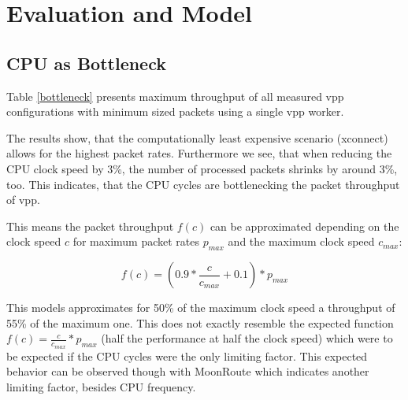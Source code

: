 \chapter{Evaluation and Model}







\section{CPU as Bottleneck}
\label{sec:cpubottleneck}

Table \ref{bottleneck} presents maximum throughput of all
measured \Ac{vpp} configurations with minimum sized packets using a single \Ac{vpp}
worker. 

The results show, that the computationally least expensive scenario
(xconnect) allows for the highest packet rates. Furthermore we see,
that when reducing the CPU clock speed by 3\%, the number of processed
packets shrinks by around 3\%, too. This indicates, that the CPU
cycles are bottlenecking the packet throughput of \Ac{vpp}.

This means the packet throughput $f(c)$ can be approximated depending on
the clock speed $c$ for maximum packet rates $p_{max}$ and the maximum
clock speed $c_{max}$:


$$ f(c) = (0.9 * \frac{c}{c_{max}} + 0.1) * p_{max} $$

This models approximates for 50\% of the maximum clock speed a
throughput of 55\% of the maximum one. This does not exactly resemble
the expected function $f(c) = \frac{c}{c_{max}} * p_{max}$ (half
the performance at half the clock speed) which were to be expected if
the CPU cycles were the only limiting factor. This expected behavior
can be observed though with MoonRoute \cite{chair:architecture} which
indicates another limiting factor, besides CPU
frequency.


